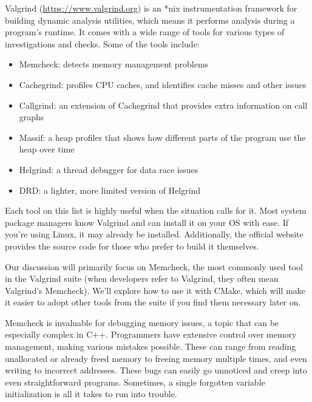 
Valgrind (\url{https://www.valgrind.org}) is an *nix instrumentation framework for building dynamic analysis utilities, which means it performs analysis during a program’s runtime. It comes with a wide range of tools for various types of investigations and checks. Some of the tools include:

\begin{itemize}
\item
Memcheck: detects memory management problems

\item
Cachegrind: profiles CPU caches, and identifies cache misses and other issues

\item
Callgrind: an extension of Cachegrind that provides extra information on call graphs

\item
Massif: a heap profiler that shows how different parts of the program use the heap over time

\item
Helgrind: a thread debugger for data race issues

\item
DRD: a lighter, more limited version of Helgrind
\end{itemize}

Each tool on this list is highly useful when the situation calls for it. Most system package managers know Valgrind and can install it on your OS with ease. If you’re using Linux, it may already be installed. Additionally, the official website provides the source code for those who prefer to build it themselves.

Our discussion will primarily focus on Memcheck, the most commonly used tool in the Valgrind suite (when developers refer to Valgrind, they often mean Valgrind's Memcheck). We’ll explore how to use it with CMake, which will make it easier to adopt other tools from the suite if you find them necessary later on.


Memcheck is invaluable for debugging memory issues, a topic that can be especially complex in C++. Programmers have extensive control over memory management, making various mistakes possible. These can range from reading unallocated or already freed memory to freeing memory multiple times, and even writing to incorrect addresses. These bugs can easily go unnoticed and creep into even straightforward programs. Sometimes, a single forgotten variable initialization is all it takes to run into trouble.

